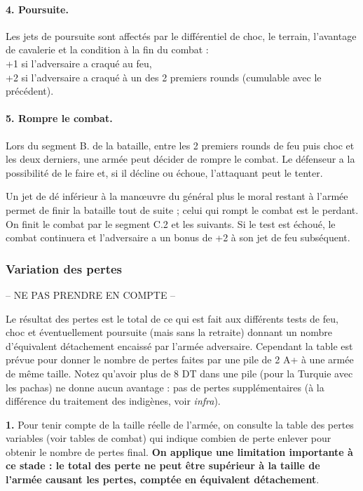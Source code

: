 \paragraph{4. Poursuite.}
Les jets de poursuite sont affectés par le différentiel de choc,
le terrain, l'avantage de cavalerie et la condition à la fin du combat : \\
+1 si l'adversaire a craqué au feu, \\
+2 si l'adversaire a craqué à un des 2 premiers rounds (cumulable avec le précédent).

\paragraph{5. Rompre le combat.}\label{RetraiteEnBataille}
Lors du segment B. de la bataille, entre les 2 premiers rounds de feu puis choc et les
deux derniers, une armée peut décider de rompre le combat. 
Le défenseur a la possibilité de le faire et, si il décline ou échoue, l'attaquant
peut le tenter.

Un jet de dé inférieur à la man{\oe}uvre du général plus le moral restant à l'armée
permet de finir la bataille tout de suite ;
celui qui rompt le combat est le perdant. On finit le combat par le segment  C.2
et les suivants. Si le test est échoué, le combat continuera et l'adversaire a un
bonus de +2 à son jet de feu subséquent.


\subsubsection{Variation des pertes}
-- NE PAS PRENDRE EN COMPTE --

\label{PertesVariables}
Le résultat des pertes est le total de ce qui est fait aux différents tests de feu,
choc et éventuellement poursuite (mais sans la retraite) donnant un nombre d'équivalent 
détachement encaissé par 
l'armée adversaire. Cependant la table est prévue pour donner le nombre de 
pertes faites par une pile de 2 A+ à une armée de même taille. Notez 
qu'avoir plus de 8 DT dans une pile (pour la Turquie avec les pachas) ne 
donne aucun avantage : pas de pertes supplémentaires (à la différence
du traitement des indigènes, voir \textit{infra}).

{\bf 1.} Pour tenir compte de la taille réelle de l'armée, on consulte la table des 
pertes variables (voir tables de combat) qui indique combien de perte enlever pour obtenir le nombre 
de pertes final. \textbf{On applique une limitation importante à ce stade :
le total des 
perte ne peut être supérieur à la taille de l'armée causant les pertes, comptée 
en équivalent détachement}. 

